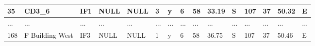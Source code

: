 {\begin{table}[]
\begin{tabular}{|l|l|l|l|l|l|l|l|l|l|l|l|l|l|l|}
		35                                & CD3\_6                                    & IF1                                       & NULL                            & NULL                            & 3                               & y                                    & 6                                                                                    & 58                                                                                   & 33.19                                                                                & S                                                                                 & 107                                                                                   & 37                                                                                    & 50.32                                                                                 & E                                                                                  \\ \hline
		...                               & ...                                       & ...                                       & ...                             & ...                             & ...                             & ...                                  & ...                                                                                  & ...                                                                                  & ...                                                                                  & ...                                                                               & ...                                                                                   & ...                                                                                   & ...                                                                                   & ...                                                                                \\ \hline
		168                               & F Building West                           & IF3                                       & NULL                            & NULL                            & 1                               & y                                    & 6                                                                                    & 58                                                                                   & 36.75                                                                                & S                                                                                 & 107                                                                                   & 37                                                                                    & 50.46                                                                                 & E                                                                                  \\ \hline
	\end{tabular}
\end{table}
}